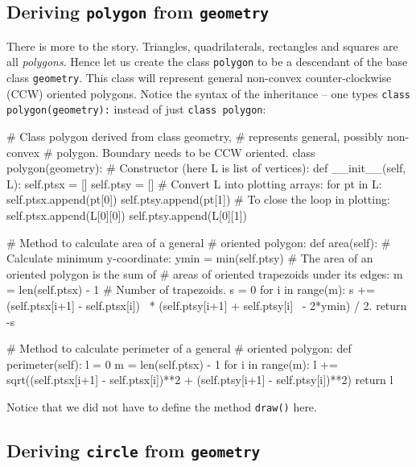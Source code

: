 \subsection{Deriving {\tt polygon} from {\tt geometry}}

There is more to the story. Triangles, quadrilaterals, rectangles and squares are all 
{\em polygons}. Hence let us create the class {\tt polygon} to be a descendant 
of the base class {\tt geometry}. This class will represent general non-convex
counter-clockwise (CCW) oriented polygons. Notice the syntax of the inheritance -- 
one types {\tt class polygon(geometry):} instead of just {\tt class polygon}:

\begin{bluecode}
# Class polygon derived from class geometry, 
# represents general, possibly non-convex 
# polygon. Boundary needs to be CCW oriented.
class polygon(geometry):
    # Constructor (here L is list of vertices):
    def __init__(self, L):
        self.ptsx = []
        self.ptsy = []
        # Convert L into plotting arrays:
        for pt in L:
            self.ptsx.append(pt[0])
            self.ptsy.append(pt[1])
        # To close the loop in plotting:
        self.ptsx.append(L[0][0])
        self.ptsy.append(L[0][1])
         
    # Method to calculate area of a general 
    # oriented polygon:
    def area(self):
        # Calculate minimum y-coordinate:
        ymin = min(self.ptsy)
        # The area of an oriented polygon is the sum of 
        # areas of oriented trapezoids under its edges:
        m = len(self.ptsx) - 1   # Number of trapezoids.
        s = 0
        for i in range(m):
            s += (self.ptsx[i+1] - self.ptsx[i]) \
                 * (self.ptsy[i+1] + self.ptsy[i] \
                 - 2*ymin) / 2.
        return -s

    # Method to calculate perimeter of a general
    # oriented polygon:
    def perimeter(self):
        l = 0
        m = len(self.ptsx) - 1
        for i in range(m):
            l += sqrt((self.ptsx[i+1] - self.ptsx[i])**2 
                 + (self.ptsy[i+1] - self.ptsy[i])**2)
        return l
\end{bluecode}
Notice that we did not have to define the method {\tt draw()} here. 

\subsection{Deriving {\tt circle} from {\tt geometry}}

